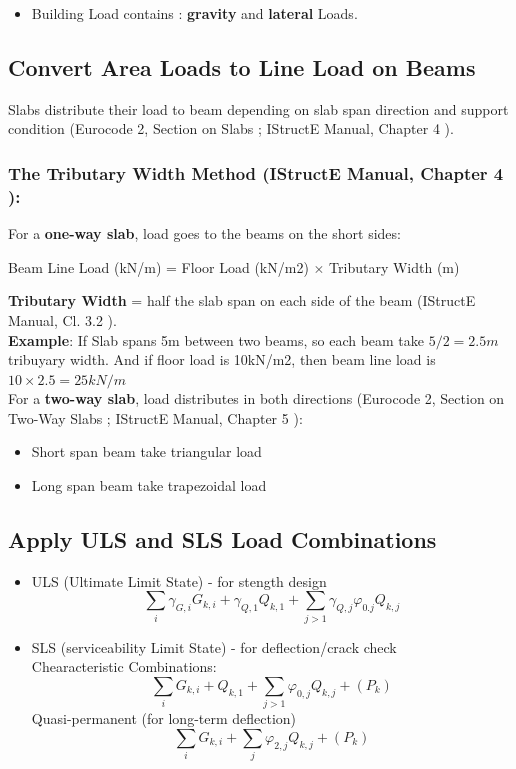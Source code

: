 \begin{itemize}
    \item Building Load contains : \textbf{gravity} and \textbf{lateral} Loads.
\end{itemize}
\subsection{Convert Area Loads to Line Load on Beams}
Slabs distribute their load to beam depending on slab span direction and support condition (Eurocode 2, Section on Slabs \cite{EN1992-1-1-2023(1)}; IStructE Manual, Chapter 4 \cite{IStructE2006(6)}).
\subsubsection*{The Tributary Width Method (IStructE Manual, Chapter 4 \cite{IStructE2006(6)}):}
For a \textbf{one-way slab}, load goes to the beams on the short sides:
\begin{center}
\begin{tcolorbox}[colback=white]
Beam Line Load (kN/m) = Floor Load (kN/m2) \(\times\) Tributary Width (m)
\end{tcolorbox}
\end{center}
\textbf{Tributary Width} = half the slab span on each side of the beam (IStructE Manual, Cl. 3.2 \cite{IStructE2006(6)}). \\[2mm]
\textbf{Example}: If Slab spans 5m between two beams, so each beam take \(5/2 = 2.5m\) tribuyary width. And if floor load is 10kN/m2, then beam line load is \( 10 \times 2.5 = 25 kN/m\) \\[2mm]
For a \textbf{two-way slab}, load distributes in both directions
(Eurocode 2, Section on Two-Way Slabs \cite{EN1992-1-1-2023(1)}; IStructE Manual, Chapter 5 \cite{IStructE2006(6)}):
\begin{itemize}
    \item Short span beam take triangular load
    \item Long span beam take trapezoidal load
\end{itemize}
\subsection{Apply ULS and SLS Load Combinations}
\begin{itemize}
    \item ULS (Ultimate Limit State) - for stength design
    \[\sum_{i} \gamma_{G,i} G_{k,i} + \gamma_{Q,1} Q_{k,1} + \sum_{j>1} \gamma_{Q,j} \varphi_{0.j} Q_{k,j}\]
    \item SLS (serviceability Limit State) - for deflection/crack check \\[2mm]
    Chearacteristic Combinations: \[\sum_{i}G_{k,i} + Q_{k,1} + \sum_{j>1} \varphi_{0,j} Q_{k,j} + (P_k)\]
    Quasi-permanent (for long-term deflection)
    \[\sum_{i}G_{k,i} + \sum_{j}\varphi_{2,j} Q_{k,j} + (P_k)\]
\end{itemize}
